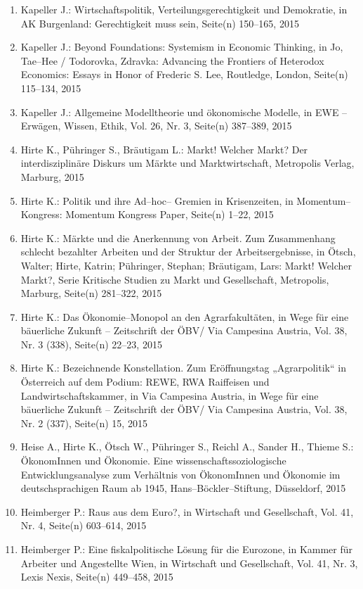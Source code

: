\begin{enumerate}
	 \item Kapeller J.: Wirtschaftspolitik, Verteilungsgerechtigkeit und Demokratie, in AK Burgenland: Gerechtigkeit muss sein, Seite(n) 150--165, 2015
	 \item Kapeller J.: Beyond Foundations: Systemism in Economic  Thinking, in Jo, Tae--Hee / Todorovka, Zdravka: Advancing the Frontiers of Heterodox Economics: Essays in Honor of Frederic S. Lee, Routledge, London, Seite(n) 115--134, 2015
	 \item Kapeller J.: Allgemeine Modelltheorie und ökonomische Modelle, in EWE -- Erwägen, Wissen, Ethik, Vol. 26, Nr. 3, Seite(n) 387--389, 2015
	 \item Hirte K., Pühringer S., Bräutigam L.: Markt! Welcher Markt? Der interdisziplinäre Diskurs um Märkte und Marktwirtschaft, Metropolis Verlag, Marburg, 2015
	 \item Hirte K.: Politik und ihre Ad--hoc-- Gremien in Krisenzeiten, in Momentum--Kongress: Momentum Kongress Paper, Seite(n) 1--22, 2015
	 \item Hirte K.: Märkte und die Anerkennung von Arbeit. Zum Zusammenhang schlecht bezahlter Arbeiten und der Struktur der Arbeitsergebnisse, in Ötsch, Walter; Hirte, Katrin; Pühringer, Stephan; Bräutigam, Lars: Markt! Welcher Markt?, Serie Kritische Studien zu Markt und Gesellschaft, Metropolis, Marburg, Seite(n) 281--322, 2015
	 \item Hirte K.: Das Ökonomie--Monopol an den Agrarfakultäten, in Wege für eine bäuerliche Zukunft – Zeitschrift der ÖBV/ Via Campesina Austria, Vol. 38, Nr. 3 (338), Seite(n) 22--23, 2015
	 \item Hirte K.: Bezeichnende Konstellation. Zum Eröffnungstag „Agrarpolitik“ in Österreich auf dem Podium: REWE, RWA Raiffeisen und Landwirtschaftskammer, in Via Campesina Austria, in Wege für eine bäuerliche Zukunft – Zeitschrift der ÖBV/ Via Campesina Austria, Vol. 38, Nr. 2 (337), Seite(n) 15, 2015
	 \item Heise A., Hirte K., Ötsch W., Pühringer S., Reichl A., Sander H., Thieme S.: ÖkonomInnen und Ökonomie. Eine wissenschaftssoziologische Entwicklungsanalyse zum Verhältnis von ÖkonomInnen und Ökonomie im deutschsprachigen Raum ab 1945, Hans--Böckler--Stiftung, Düsseldorf, 2015
	 \item Heimberger P.: Raus aus dem Euro?, in Wirtschaft und Gesellschaft, Vol. 41, Nr. 4, Seite(n) 603--614, 2015
	 \item Heimberger P.: Eine fiskalpolitische Lösung für die Eurozone, in Kammer für Arbeiter und Angestellte Wien, in Wirtschaft und Gesellschaft, Vol. 41, Nr. 3, Lexis Nexis, Seite(n) 449--458, 2015

\end{enumerate}
